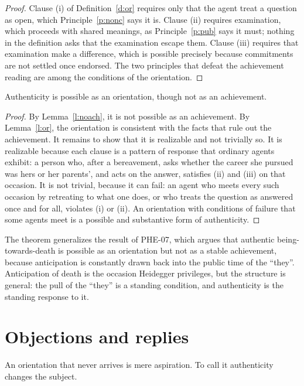 \documentclass{situationist-preprint}
\begin{document}
\begin{proof}
Clause (i) of Definition~\ref{d:or} requires only that the agent treat a question as open, which Principle~\ref{p:nonc} says it is. Clause (ii) requires examination, which proceeds with shared meanings, as Principle~\ref{p:pub} says it must; nothing in the definition asks that the examination escape them. Clause (iii) requires that examination make a difference, which is possible precisely because commitments are not settled once endorsed. The two principles that defeat the achievement reading are among the conditions of the orientation.
\end{proof}

\begin{theorem}\label{t:main}
Authenticity is possible as an orientation, though not as an achievement.
\end{theorem}

\begin{proof}
By Lemma~\ref{l:noach}, it is not possible as an achievement. By Lemma~\ref{l:or}, the orientation is consistent with the facts that rule out the achievement. It remains to show that it is realizable and not trivially so. It is realizable because each clause is a pattern of response that ordinary agents exhibit: a person who, after a bereavement, asks whether the career she pursued was hers or her parents', and acts on the answer, satisfies (ii) and (iii) on that occasion. It is not trivial, because it can fail: an agent who meets every such occasion by retreating to what one does, or who treats the question as answered once and for all, violates (i) or (ii). An orientation with conditions of failure that some agents meet is a possible and substantive form of authenticity.
\end{proof}

The theorem generalizes the result of PHE-07, which argues that authentic being-towards-death is possible as an orientation but not as a stable achievement, because anticipation is constantly drawn back into the public time of the \enquote{they}. Anticipation of death is the occasion Heidegger privileges, but the structure is general: the pull of the \enquote{they} is a standing condition, and authenticity is the standing response to it.

\section{Objections and replies}

\begin{objection}[Deflation]\label{o:defl}
An orientation that never arrives is mere aspiration. To call it authenticity changes the subject.
\end{objection}
\end{document}
